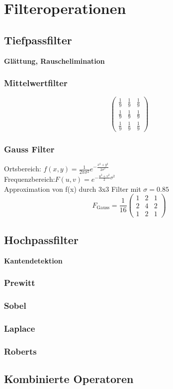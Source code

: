 \section{Filteroperationen}
\subsection{Tiefpassfilter}
\textbf{Glättung, Rauschelimination}
\subsubsection{Mittelwertfilter}
\begin{displaymath}
     \begin{pmatrix}
         \frac{1}{9} & \frac{1}{9} & \frac{1}{9} \\
         \frac{1}{9} & \frac{1}{9} & \frac{1}{9} \\
         \frac{1}{9} & \frac{1}{9} & \frac{1}{9}
     \end{pmatrix}
\end{displaymath}
\subsubsection{Gauss Filter}
Ortsbereich: $ f(x,y) = \frac{1}{2\pi\sigma^2}e^{-\frac{x^2+y^2}{2\sigma^2}}$\\
Frequenzbereich:$ F(u,v) = e^{-\frac{u^2+v^2}{2}\sigma^2} $\\
Approximation von f(x) durch 3x3 Filter mit $\sigma = 0.85$
\begin{displaymath}
     F_\text{Gauss} = \frac{1}{16} \begin{pmatrix}
         1 & 2 & 1 \\ 2&4&2\\1&2&1
 \end{pmatrix}
\end{displaymath}
\subsection{Hochpassfilter}
\textbf{Kantendetektion}

\subsubsection{Prewitt}
\subsubsection{Sobel}
\subsubsection{Laplace}
\subsubsection{Roberts}
\subsection{Kombinierte Operatoren}

